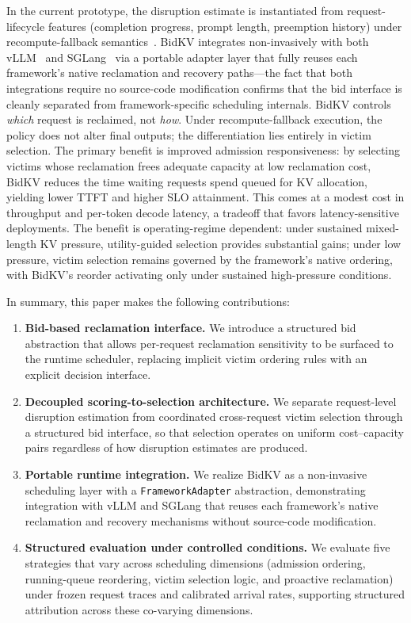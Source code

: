 \documentclass[sigconf,nonacm]{acmart}
\newcommand{\bidkv}{BidKV\xspace}
\begin{document}
In the current prototype, the disruption estimate is instantiated from
request-lifecycle features (completion progress, prompt length, preemption
history) under recompute-fallback semantics~\cite{Kwon2023}.
\bidkv integrates non-invasively with both vLLM~\cite{Kwon2023} and
SGLang~\cite{Zheng2024sglang} via a portable adapter layer that fully reuses
each framework's native reclamation and recovery paths---the fact that both
integrations require no source-code modification confirms that the bid
interface is cleanly separated from framework-specific scheduling internals.
\bidkv controls \emph{which} request is reclaimed, not \emph{how}.  Under
recompute-fallback execution, the policy does not alter final outputs; the
differentiation lies entirely in victim selection.  The primary benefit is
improved admission responsiveness: by selecting victims whose reclamation
frees adequate capacity at low reclamation cost, \bidkv reduces the time
waiting requests spend queued for KV allocation, yielding lower TTFT and
higher SLO attainment.  This comes at a modest cost in throughput and
per-token decode latency, a tradeoff that favors latency-sensitive
deployments.  The benefit is operating-regime dependent: under sustained
mixed-length KV pressure, utility-guided selection provides substantial
gains; under low pressure, victim selection remains governed by the
framework's native ordering, with \bidkv's reorder activating only under
sustained high-pressure conditions.


In summary, this paper makes the following contributions:
\begin{enumerate}[leftmargin=*,nosep]
\item \textbf{Bid-based reclamation interface.}
  We introduce a structured bid abstraction that allows per-request
  reclamation sensitivity to be surfaced to the runtime scheduler, replacing
  implicit victim ordering rules with an explicit decision interface.

\item \textbf{Decoupled scoring-to-selection architecture.}
  We separate request-level disruption estimation from coordinated
  cross-request victim selection through a structured bid interface,
  so that selection operates on uniform cost--capacity pairs regardless
  of how disruption estimates are produced.

\item \textbf{Portable runtime integration.}
  We realize \bidkv as a non-invasive scheduling layer with a
  \texttt{Framework\-Adapter} abstraction, demonstrating integration with
  vLLM and SGLang that reuses each framework's native reclamation and
  recovery mechanisms without source-code modification.

\item \textbf{Structured evaluation under controlled conditions.}
  We evaluate five strategies that vary across scheduling dimensions
  (admission ordering, running-queue reordering, victim selection logic,
  and proactive reclamation) under frozen request traces and calibrated
  arrival rates, supporting structured attribution across these co-varying
  dimensions.
\end{enumerate}
\end{document}

